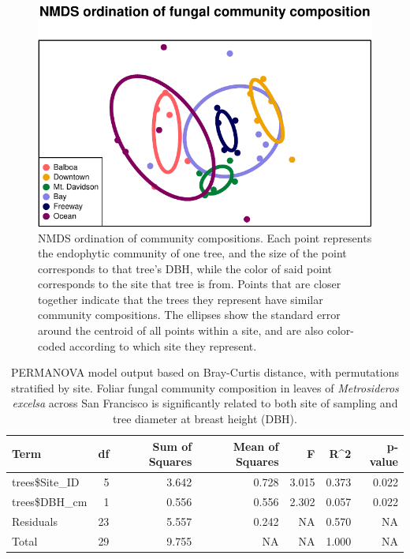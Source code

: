 \documentclass[fleqn,10pt,lineno]{wlpeerj} %
\begin{document}
\begin{figure}
\centering
\includegraphics{gibson2021_files/figure-latex/nmds-plot-1.pdf}
\caption{\label{fig:nmds-plot}NMDS ordination of community compositions. Each point represents the endophytic community of one tree, and the size of the point corresponds to that tree's DBH, while the color of said point corresponds to the site that tree is from. Points that are closer together indicate that the trees they represent have similar community compositions. The ellipses show the standard error around the centroid of all points within a site, and are also color-coded according to which site they represent.}
\end{figure}

\begin{table}[!h]

\caption{\label{tab:permanova-table}PERMANOVA model output based on Bray-Curtis distance, with permutations stratified by site. Foliar fungal community composition in leaves of \emph{Metrosideros excelsa} across San Francisco is significantly related to both site of sampling and tree diameter at breast height (DBH).}
\centering
\begin{tabular}[t]{lrrrrrr}
\toprule
Term & df & Sum of Squares & Mean of Squares & F & R\textasciicircum{}2 & p-value\\
\midrule
trees\$Site\_ID & 5 & 3.642 & 0.728 & 3.015 & 0.373 & 0.022\\
trees\$DBH\_cm & 1 & 0.556 & 0.556 & 2.302 & 0.057 & 0.022\\
Residuals & 23 & 5.557 & 0.242 & NA & 0.570 & NA\\
Total & 29 & 9.755 & NA & NA & 1.000 & NA\\
\bottomrule
\end{tabular}
\end{table}
\end{document}
